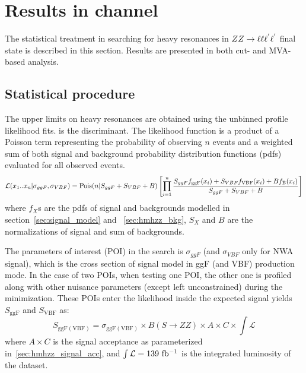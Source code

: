 \section{Results in \llll channel}
\label{sec:hmhzz_result_4l}

The statistical treatment in searching for heavy resonances in $ZZ \rightarrow \ell\ell\ell^{'}\ell^{'}$ final state is described in this section.
Results are presented in both cut- and MVA- based analysis.

\subsection{Statistical procedure}

The upper limits on heavy resonances are obtained using the unbinned profile likelihood fits.
\mfl is the discriminant.
The likelihood function is a product of a Poisson term representing the probability of observing $n$ events 
and a weighted sum of both signal and background probability distribution functions (pdfs) evaluated for all observed events.
\begingroup
\small
\begin{equation}
  {\cal L } (x_{1}..x_{n}| \sigma_{ggF}, \sigma_{VBF}) = \textrm{Pois}(n|S_{ggF} + S_{VBF} + B)  \left[ \prod\limits^{n}_{i=1}
  \frac{S_{ggF} f_{\textrm{ggF}}(x_{i}) + S_{VBF} f_{\textrm{VBF}}(x_{i}) + B f_{\textrm{B}}(x_{i})}{S_{ggF} + S_{VBF} + B}
  \right]
\end{equation}
\endgroup
where $f_X$s are the pdfs of signal and backgrounds modelled in section~\ref{sec:signal_model} and ~\ref{sec:hmhzz_bkg}, 
$S_X$ and $B$ are the normalizations of signal and sum of backgrounds.

The parameters of interest (POI) in the search is $\sigma_{ggF}$ (and $\sigma_{VBF}$ only for NWA signal), which is the cross section of signal model in ggF (and VBF) production mode.
In the case of two POIs, when testing one POI, the other one is profiled along with other nuisance parameters (except left unconstrained) during the minimization. 
These POIs enter the likelihood inside the expected signal yields $S_{\mathrm{ggF}}$ and $S_{\mathrm{VBF}}$ as:
\begingroup
\small
\begin{equation}
S_{\mathrm{ggF(VBF)}} = \sigma_{\mathrm{ggF(VBF)}} \times B(S\rightarrow ZZ) \times A \times C \times \int\mathcal{L}
\end{equation}
\endgroup
where $A\times C$ is the signal acceptance as parameterized in~\ref{sec:hmhzz_signal_acc}, and $\int\mathcal{L} = 139~\mbox{fb\(^{-1}\)} $ is the integrated luminosity of the dataset.

